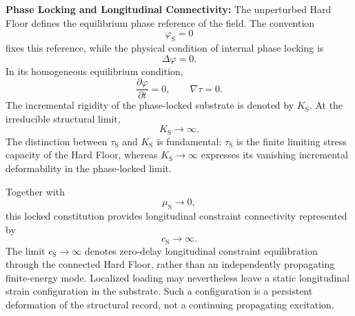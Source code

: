 \noindent\textbf{Phase Locking and Longitudinal Connectivity:} The unperturbed Hard Floor defines the equilibrium phase reference of the field. The convention
\begin{equation}
    \varphi_{\mathrm{S}} = 0
\end{equation}
fixes this reference, while the physical condition of internal phase locking is
\begin{equation}
    \Delta\varphi = 0.
\end{equation}
In its homogeneous equilibrium condition,
\begin{equation}
    \frac{\partial\varphi}{\partial t} = 0, \qquad \nabla\tau = 0.
\end{equation}
The incremental rigidity of the phase-locked substrate is denoted by $K_{\mathrm{S}}$. At the irreducible structural limit,
\begin{equation}
    K_{\mathrm{S}} \rightarrow \infty.
\end{equation}
The distinction between $\tau_{\mathrm{S}}$ and $K_{\mathrm{S}}$ is fundamental: $\tau_{\mathrm{S}}$ is the finite limiting stress capacity of the Hard Floor, whereas $K_{\mathrm{S}} \rightarrow \infty$ expresses its vanishing incremental deformability in the phase-locked limit.

Together with
\begin{equation}
    \mu_{\mathrm{S}} \rightarrow 0,
\end{equation}
this locked constitution provides longitudinal constraint connectivity represented by
\begin{equation}
    c_{\mathrm{S}} \rightarrow \infty.
\end{equation}
The limit $c_{\mathrm{S}} \rightarrow \infty$ denotes zero-delay longitudinal constraint equilibration through the connected Hard Floor, rather than an independently propagating finite-energy mode. Localized loading may nevertheless leave a static longitudinal strain configuration in the substrate. Such a configuration is a persistent deformation of the structural record, not a continuing propagating excitation.

